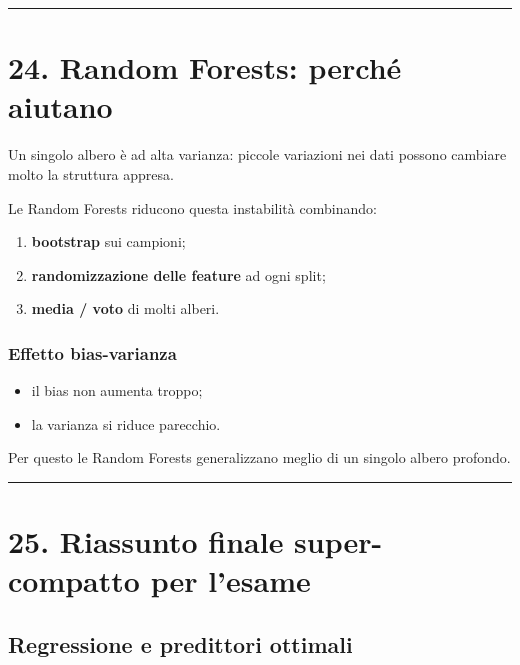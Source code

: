 \documentclass[
]{article}
\providecommand{\tightlist}{%
  \setlength{\itemsep}{0pt}\setlength{\parskip}{0pt}}
\begin{document}
\begin{center}\rule{0.5\linewidth}{0.5pt}\end{center}

\section{24. Random Forests: perché
aiutano}\label{random-forests-perchuxe9-aiutano}

Un singolo albero è ad alta varianza: piccole variazioni nei dati
possono cambiare molto la struttura appresa.

Le Random Forests riducono questa instabilità combinando:

\begin{enumerate}
\def\labelenumi{\arabic{enumi}.}
\tightlist
\item
  \textbf{bootstrap} sui campioni;
\item
  \textbf{randomizzazione delle feature} ad ogni split;
\item
  \textbf{media / voto} di molti alberi.
\end{enumerate}

\subsubsection{Effetto bias-varianza}\label{effetto-bias-varianza}

\begin{itemize}
\tightlist
\item
  il bias non aumenta troppo;
\item
  la varianza si riduce parecchio.
\end{itemize}

Per questo le Random Forests generalizzano meglio di un singolo albero
profondo.

\begin{center}\rule{0.5\linewidth}{0.5pt}\end{center}

\section{25. Riassunto finale super-compatto per
l'esame}\label{riassunto-finale-super-compatto-per-lesame}

\subsection{Regressione e predittori
ottimali}\label{regressione-e-predittori-ottimali}
\end{document}
